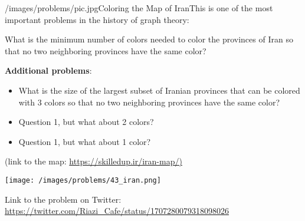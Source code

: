 \begin{problem}{/images/problems/pic.jpg}{Coloring the Map of Iran}This is one of the most important problems in the history of graph theory:
	
What is the minimum number of colors needed to color the provinces of Iran so that no two neighboring provinces have the same color?

\textbf{Additional problems}:
\begin{itemize}
\item What is the size of the largest subset of Iranian provinces that can be colored with 3 colors so that no two neighboring provinces have the same color?
\item Question 1, but what about 2 colors?
\item Question 1, but what about 1 color?
\end{itemize}
(link to the map:  \url{https://skilledup.ir/iran-map/)}

\begin{center}
	\texttt{[image: /images/problems/43\_iran.png]}
\end{center}

 Link to the problem on Twitter: \url{https://twitter.com/Riazi_Cafe/status/1707280079318098026}\end{problem}
